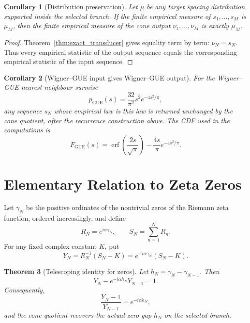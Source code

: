 \documentclass[11pt]{amsart}
\numberwithin{equation}{section}
\theoremstyle{plain}
\newtheorem{theorem}{Theorem}[section]
\newtheorem{corollary}[theorem]{Corollary}
\theoremstyle{definition}
\theoremstyle{remark}
\begin{document}
\begin{corollary}[Distribution preservation]
\label{cor:distribution_preservation}
Let $\mu$ be any target spacing distribution supported inside the selected branch. If the finite empirical measure of $s_1,\ldots,s_M$ is $\mu_M$, then the finite empirical measure of the cone output $\nu_1,\ldots,\nu_M$ is exactly $\mu_M$.
\end{corollary}

\begin{proof}
Theorem~\ref{thm:exact_transducer} gives equality term by term: $\nu_N=s_N$. Thus every empirical statistic of the output sequence equals the corresponding empirical statistic of the input sequence.
\end{proof}

\begin{corollary}[Wigner--GUE input gives Wigner--GUE output]
\label{cor:wigner_gue_preservation}
For the Wigner--GUE nearest-neighbour surmise
\begin{equation}
p_{\mathrm{GUE}}(s)=\frac{32}{\pi^2}s^2e^{-4s^2/\pi},
\label{eq:gue_density}
\end{equation}
any sequence $s_N$ whose empirical law is this law is returned unchanged by the cone quotient, after the recurrence construction above. The CDF used in the computations is
\begin{equation}
F_{\mathrm{GUE}}(s)=\operatorname{erf}\!\left(\frac{2s}{\sqrt{\pi}}\right)-\frac{4s}{\pi}e^{-4s^2/\pi}.
\label{eq:gue_cdf}
\end{equation}
\end{corollary}

\section{Elementary Relation to Zeta Zeros}
\label{sec:zeta_relation}

Let $\gamma_N$ be the positive ordinates of the nontrivial zeros of the Riemann zeta function, ordered increasingly, and define
\begin{equation}
R_N=e^{i\alpha\gamma_N},
\qquad
S_N=\sum_{n=1}^{N}R_n.
\label{eq:zeta_walk}
\end{equation}
For any fixed complex constant $K$, put
\begin{equation}
Y_N=R_N^{-1}(S_N-K)=e^{-i\alpha\gamma_N}(S_N-K).
\label{eq:y_from_zeta_walk}
\end{equation}

\begin{theorem}[Telescoping identity for zeros]
\label{thm:telescoping_identity}
Let $h_N=\gamma_N-\gamma_{N-1}$. Then
\begin{equation}
Y_N-e^{-i\alpha h_N}Y_{N-1}=1.
\label{eq:zeta_telescoping_identity}
\end{equation}
Consequently,
\begin{equation}
\frac{Y_N-1}{Y_{N-1}}=e^{-i\alpha h_N},
\label{eq:zeta_quotient_identity}
\end{equation}
and the cone quotient recovers the actual zero gap $h_N$ on the selected branch.
\end{theorem}
\end{document}
